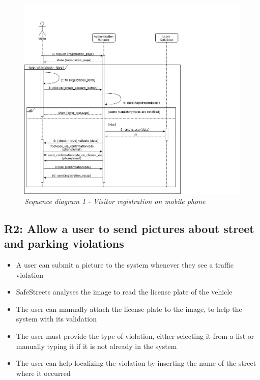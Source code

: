 \begin{figure}[H]
    \centering
    \includegraphics[width=\textwidth]{RASD_Images/SequenceDiagrams/1.jpg}
    \caption{\textit{Sequence diagram 1 - Visitor registration on mobile phone}}
\end{figure}

\subsection{R2: Allow a user to send pictures about street and parking violations}
\begin{itemize}
    \item A user can submit a picture to the system whenever they see a traffic violation
    \item SafeStreets analyses the image to read the license plate of the vehicle
    \item The user can manually attach the license plate to the image, to help the system with its validation
    \item The user must provide the type of violation, either selecting it from a list or manually typing it if it is not already in the system
    \item The user can help localizing the violation by inserting the name of the street where it occurred
\end{itemize}

